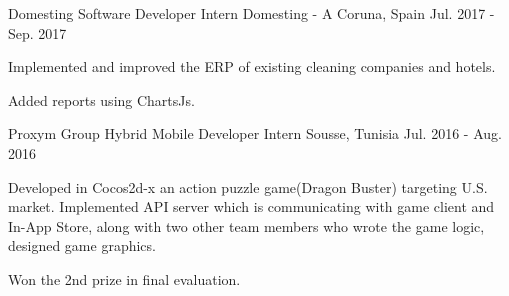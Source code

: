 \begin{cventries}
  \cventry
    {Domesting}
    {Software Developer Intern}
    {Domesting - A Coruna, Spain}
    {Jul. 2017 - Sep. 2017}
    {
      \begin{cvitems}
        \item {Implemented and improved the ERP of existing cleaning companies and hotels.}
        \item {Added reports using ChartsJs.}
        \item {}
      \end{cvitems}
    }
  \cventry
    {Proxym Group}
    {Hybrid Mobile Developer Intern}
    {Sousse, Tunisia}
    {Jul. 2016 - Aug. 2016}
    {
      \begin{cvitems}
        \item {Developed in Cocos2d-x an action puzzle game(Dragon Buster) targeting U.S. market. Implemented API server which is communicating with game client and In-App Store, along with two other team members who wrote the game logic, designed game graphics.}
        \item {Won the 2nd prize in final evaluation.}
      \end{cvitems}
    }
\end{cventries}
